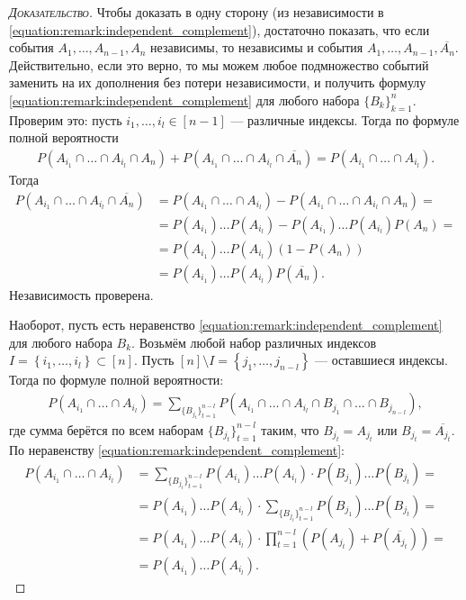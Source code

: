 \documentclass[../main.tex]{subfiles}
\begin{document}
\begin{proof}[\normalfont\textsc{Доказательство}]
 Чтобы доказать в одну сторону (из независимости в \eqref{equation:remark:independent_complement}), достаточно показать, что если события $A_1, \ldots, A_{n-1}, A_n$ независимы, то независимы и события $A_1, \ldots, A_{n-1}, \overline{A_n}$. Действительно, если это верно, то мы можем любое подмножество событий заменить на их дополнения без потери независимости, и получить формулу \eqref{equation:remark:independent_complement} для любого набора $\{B_{k}\}_{k=1}^{n} $. Проверим это: пусть $i_1, \ldots, i_{l} \in [n-1]$ --- различные индексы. Тогда по формуле полной вероятности
 \begin{align*}
  P(A_{i_1} \cap \ldots \cap A_{i_l} \cap A_n) + P(A_{i_1} \cap \ldots \cap A_{i_l} \cap \overline{A_n}) = P(A_{i_1} \cap \ldots \cap A_{i_l}).
 \end{align*} Тогда
 \begin{align*}
  P(A_{i_1} \cap \ldots \cap A_{i_l}\cap \overline{A_n}) &= P(A_{i_1} \cap \ldots \cap A_{i_l}) - P(A_{i_1} \cap \ldots \cap A_{i_l} \cap A_n) = \\
  &= P(A_{i_1})  \ldots  P(A_{i_l}) - P(A_{i_1})  \ldots  P(A_{i_l})  P(A_n) = \\
  &= P(A_{i_1})  \ldots  P(A_{i_l})  (1 - P(A_n)) \\
  &= P(A_{i_1})  \ldots  P(A_{i_l})  P(\overline{A_n}).
 \end{align*} Независимость проверена.

 Наоборот, пусть есть неравенство \eqref{equation:remark:independent_complement} для любого набора $B_k$. Возьмём любой набор различных индексов $I = \left\{i_1, \ldots, i_l \right\} \subset [n]$. Пусть $[n] \setminus I = \left\{ j_1, \ldots, j_{n-l} \right\}$ --- оставшиеся индексы. Тогда по формуле полной вероятности:
 \begin{align*}
  P(A_{i_1} \cap \ldots \cap A_{i_l}) = \sum_{\{B_{j_t}\}_{t=1}^{n-l} } P(A_{i_1} \cap \ldots \cap A_{i_l} \cap B_{j_1} \cap \ldots \cap B_{j_{n-l}}),
 \end{align*} где сумма берётся по всем наборам $ \{B_{j_t}\}_{t=1}^{n-l} $ таким, что $B_{j_t} = A_{j_t}$ или $B_{j_t} = \overline{A_{j_t}}$. По неравенству \eqref{equation:remark:independent_complement}:
 \begin{align*}
  P(A_{i_1} \cap \ldots \cap A_{i_l}) &= \sum_{\{B_{j_t}\}_{t=1}^{n-l} } P(A_{i_1}) \ldots P(A_{i_l}) \cdot P(B_{j_1}) \ldots P(B_{j_t}) = \\
  &= P(A_{i_1}) \ldots P(A_{i_l}) \cdot \sum_{\{B_{j_t}\}_{t=1}^{n-l} } P(B_{j_1}) \ldots P(B_{j_t}) = \\
  &= P(A_{i_1}) \ldots P(A_{i_l}) \cdot \prod_{t=1}^{n-l} (P(A_{j_t}) + P(\overline{A_{j_t}})) = \\
  &= P(A_{i_1}) \ldots P(A_{i_l}).
 \end{align*} 
\end{proof}
\end{document}
